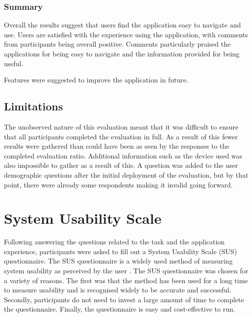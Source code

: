 \documentclass{l4proj}
\begin{document}
\subsubsection{Summary}
Overall the results suggest that users find the application easy to navigate and use. Users are satisfied with the experience using the application,  with comments from participants being overall positive. Comments particularly praised the applications for being easy to navigate and the information provided for being useful.

Features were suggested to improve the application in future.

\subsection{Limitations} \label{evalLims}
The unobserved nature of this evaluation meant that it was difficult to ensure that all participants completed the evaluation in full. As a result of this fewer results were gathered than could have been as seen by the responses to the completed evaluation ratio. Additional information such as the device used was also impossible to gather as a result of this. A question was added to the user demographic questions after the initial deployment of the evaluation,  but by that point,  there were already some respondents making it invalid going forward.

\section{System Usability Scale}
Following answering the questions related to the task and the application experience,  participants were asked to fill out a System Usability Scale (SUS) questionnaire. The SUS questionnaire is a widely used method of measuring system usability as perceived by the user \citep{lewis2018system}. The SUS questionnaire was chosen for a variety of reasons. The first was that the method has been used for a long time to measure usability and is recognised widely to be accurate and successful. Secondly,  participants do not need to invest a large amount of time to complete the questionnaire. Finally,  the questionnaire is easy and cost-effective to run.
\end{document}
